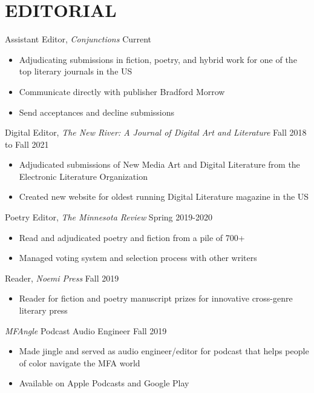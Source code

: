 \section{EDITORIAL}

Assistant Editor, \emph{Conjunctions}
 \hfill Current \\
 \begin{itemize}
  \item Adjudicating submissions in fiction, poetry, and hybrid work for one of the top literary journals in the US
  \item Communicate directly with publisher Bradford Morrow
  \item Send acceptances and decline submissions 
 \end{itemize} 


Digital Editor, \emph{The New River: A Journal of Digital Art and Literature}
 \hfill Fall 2018 to Fall 2021 \\
 \begin{itemize}
  \item Adjudicated submissions of New Media Art and Digital Literature from the Electronic Literature Organization
 \item Created new website for oldest running Digital Literature magazine in the US\\
 \end{itemize} 
 
Poetry Editor,  \emph{The Minnesota Review}  \hfill Spring 2019-2020 \\
 \begin{itemize}
 \item  Read and adjudicated poetry and fiction from a pile of 700+
 \item Managed voting system and selection process with other writers
 \end{itemize}
 
Reader,  \emph{Noemi Press}  \hfill Fall 2019 \\
 \begin{itemize}
 \item Reader for fiction and poetry manuscript prizes for innovative cross-genre literary press
 \end{itemize}
 
\emph{MFAngle} Podcast Audio Engineer \hfill Fall 2019 \\
\begin{itemize}
\item Made jingle and served as audio engineer/editor for podcast that helps people of color navigate the MFA world
\item Available on Apple Podcasts and Google Play
\end{itemize}

